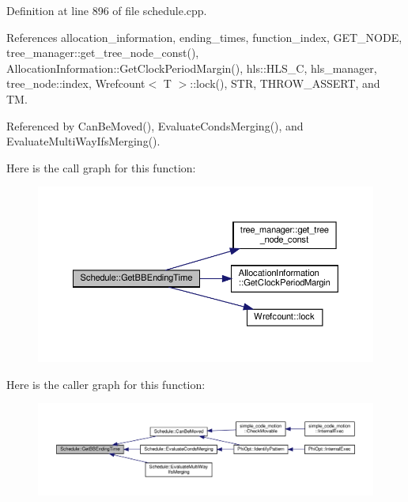 Definition at line 896 of file schedule.\+cpp.



References allocation\+\_\+information, ending\+\_\+times, function\+\_\+index, G\+E\+T\+\_\+\+N\+O\+DE, tree\+\_\+manager\+::get\+\_\+tree\+\_\+node\+\_\+const(), Allocation\+Information\+::\+Get\+Clock\+Period\+Margin(), hls\+::\+H\+L\+S\+\_\+C, hls\+\_\+manager, tree\+\_\+node\+::index, Wrefcount$<$ T $>$\+::lock(), S\+TR, T\+H\+R\+O\+W\+\_\+\+A\+S\+S\+E\+RT, and TM.



Referenced by Can\+Be\+Moved(), Evaluate\+Conds\+Merging(), and Evaluate\+Multi\+Way\+Ifs\+Merging().

Here is the call graph for this function\+:
\nopagebreak
\begin{figure}[H]
\begin{center}
\leavevmode
\includegraphics[width=350pt]{df/d61/classSchedule_a22d0a54d38e05ab87f86b5c898908816_cgraph}
\end{center}
\end{figure}
Here is the caller graph for this function\+:
\nopagebreak
\begin{figure}[H]
\begin{center}
\leavevmode
\includegraphics[width=350pt]{df/d61/classSchedule_a22d0a54d38e05ab87f86b5c898908816_icgraph}
\end{center}
\end{figure}
\mbox{\label{classSchedule_a964e824c93e67dae2f72137c8a6f2a05}} 

